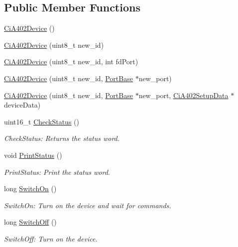 \subsection*{Public Member Functions}
\begin{DoxyCompactItemize}
\item 
\hyperlink{classCiA402Device_a894ef30b3c5a0ed291b086ad2156e4c1}{Ci\+A402\+Device} ()
\item 
\hyperlink{classCiA402Device_a77998e6d9ac4b75764612f3cab7426ef}{Ci\+A402\+Device} (uint8\+\_\+t new\+\_\+id)
\item 
\hyperlink{classCiA402Device_a084b18ac995775f5079c8b260ec4c6c8}{Ci\+A402\+Device} (uint8\+\_\+t new\+\_\+id, int fd\+Port)
\item 
\hyperlink{classCiA402Device_a017bcbc5d6e7a87b950b3cf2fcff1c41}{Ci\+A402\+Device} (uint8\+\_\+t new\+\_\+id, \hyperlink{classPortBase}{Port\+Base} $\ast$new\+\_\+port)
\item 
\hyperlink{classCiA402Device_a4c0e432fc2cc0189bd415904bdb0e31b}{Ci\+A402\+Device} (uint8\+\_\+t new\+\_\+id, \hyperlink{classPortBase}{Port\+Base} $\ast$new\+\_\+port, \hyperlink{classCiA402SetupData}{Ci\+A402\+Setup\+Data} $\ast$device\+Data)
\item 
uint16\+\_\+t \hyperlink{classCiA402Device_a5a034b00c87d2ec9ec98157b772465d9}{Check\+Status} ()
\begin{DoxyCompactList}\small\item\em Check\+Status\+: Returns the status word. \end{DoxyCompactList}\item 
void \hyperlink{classCiA402Device_a9d5d8df28085395a3ab711107a181ebc}{Print\+Status} ()
\begin{DoxyCompactList}\small\item\em Print\+Status\+: Print the status word. \end{DoxyCompactList}\item 
long \hyperlink{classCiA402Device_ab77bce0d7f42429f5f8f092aacb02754}{Switch\+On} ()
\begin{DoxyCompactList}\small\item\em Switch\+On\+: Turn on the device and wait for commands. \end{DoxyCompactList}\item 
long \hyperlink{classCiA402Device_a97acf47b3e3751c85fa70091d3bdfa6a}{Switch\+Off} ()
\begin{DoxyCompactList}\small\item\em Switch\+Off\+: Turn on the device. \end{DoxyCompactList}\item 

\end{DoxyCompactItemize}
